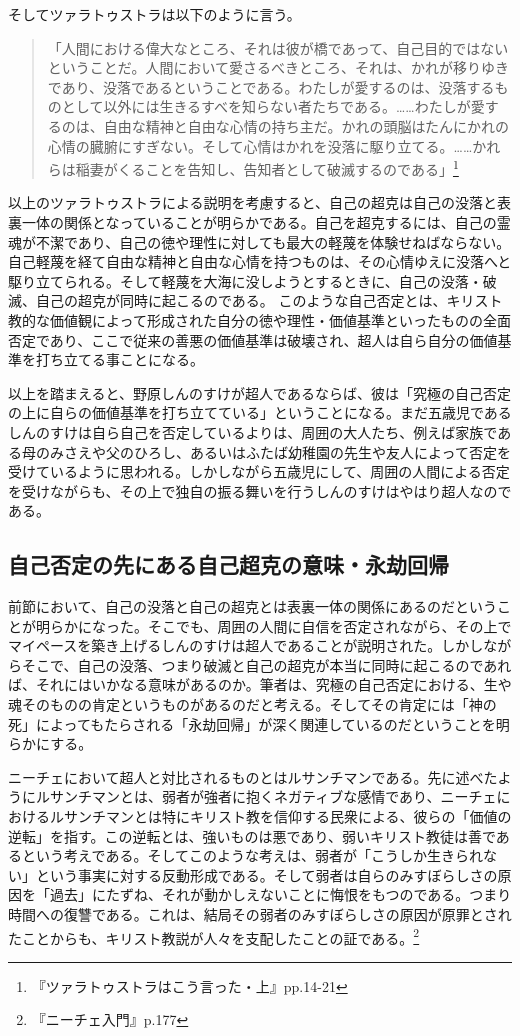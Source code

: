 \documentclass[b5j,twoside,twocolumn]{utarticle}
\begin{document}
そしてツァラトゥストラは以下のように言う。
\begin{quote}
「人間における偉大なところ、それは彼が橋であって、自己目的ではないということだ。人間において愛さるべきところ、それは、かれが移りゆきであり、没落であるということである。わたしが愛するのは、没落するものとして以外には生きるすべを知らない者たちである。……わたしが愛するのは、自由な精神と自由な心情の持ち主だ。かれの頭脳はたんにかれの心情の臓腑にすぎない。そして心情はかれを没落に駆り立てる。……かれらは稲妻がくることを告知し、告知者として破滅するのである」\footnote{『ツァラトゥストラはこう言った・上』pp.14-21}
\end{quote}


以上のツァラトゥストラによる説明を考慮すると、自己の超克は自己の没落と表裏一体の関係となっていることが明らかである。自己を超克するには、自己の霊魂が不潔であり、自己の徳や理性に対しても最大の軽蔑を体験せねばならない。自己軽蔑を経て自由な精神と自由な心情を持つものは、その心情ゆえに没落へと駆り立てられる。そして軽蔑を大海に没しようとするときに、自己の没落・破滅、自己の超克が同時に起こるのである。
このような自己否定とは、キリスト教的な価値観によって形成された自分の徳や理性・価値基準といったものの全面否定であり、ここで従来の善悪の価値基準は破壊され、超人は自ら自分の価値基準を打ち立てる事ことになる。


以上を踏まえると、野原しんのすけが超人であるならば、彼は「究極の自己否定の上に自らの価値基準を打ち立てている」ということになる。まだ五歳児であるしんのすけは自ら自己を否定しているよりは、周囲の大人たち、例えば家族である母のみさえや父のひろし、あるいはふたば幼稚園の先生や友人によって否定を受けているように思われる。しかしながら五歳児にして、周囲の人間による否定を受けながらも、その上で独自の振る舞いを行うしんのすけはやはり超人なのである。

\subsection{自己否定の先にある自己超克の意味・永劫回帰}
前節において、自己の没落と自己の超克とは表裏一体の関係にあるのだということが明らかになった。そこでも、周囲の人間に自信を否定されながら、その上でマイペースを築き上げるしんのすけは超人であることが説明された。しかしながらそこで、自己の没落、つまり破滅と自己の超克が本当に同時に起こるのであれば、それにはいかなる意味があるのか。筆者は、究極の自己否定における、生や魂そのものの肯定というものがあるのだと考える。そしてその肯定には「神の死」によってもたらされる「永劫回帰」が深く関連しているのだということを明らかにする。


ニーチェにおいて超人と対比されるものとはルサンチマンである。先に述べたようにルサンチマンとは、弱者が強者に抱くネガティブな感情であり、ニーチェにおけるルサンチマンとは特にキリスト教を信仰する民衆による、彼らの「価値の逆転」を指す。この逆転とは、強いものは悪であり、弱いキリスト教徒は善であるという考えである。そしてこのような考えは、弱者が「こうしか生きられない」という事実に対する反動形成である。そして弱者は自らのみすぼらしさの原因を「過去」にたずね、それが動かしえないことに悔恨をもつのである。つまり時間への復讐である。これは、結局その弱者のみすぼらしさの原因が原罪とされたことからも、キリスト教説が人々を支配したことの証である。\footnote{『ニーチェ入門』p.177}
\end{document}
